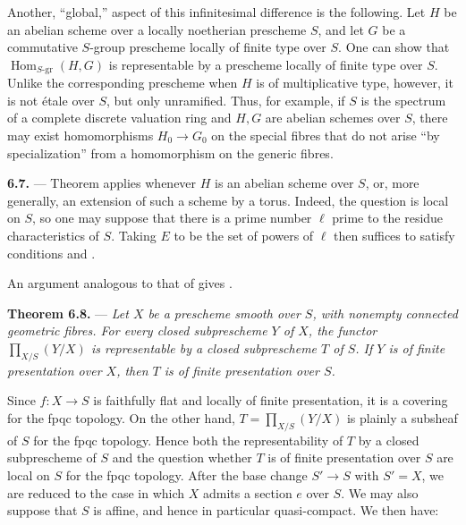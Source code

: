 Another, ``global,'' aspect of this infinitesimal difference is the
following.  Let \(H\) be an abelian scheme over a locally noetherian
prescheme \(S\), and let \(G\) be a commutative \(S\)-group prescheme
locally of finite type over \(S\).  One can show that
\(\operatorname{Hom}_{S\text{-}\mathrm{gr}}(H,G)\) is representable
by a prescheme locally of finite type over \(S\).  Unlike the
corresponding prescheme when \(H\) is of multiplicative type,
however, it is not étale over \(S\), but only unramified.  Thus, for
example, if \(S\) is the spectrum of a complete discrete valuation
ring and \(H,G\) are abelian schemes over \(S\), there may exist
homomorphisms \(H_0\to G_0\) on the special fibres that do not arise
``by specialization'' from a homomorphism on the generic fibres.

\medskip
\noindent{}\textbf{6.7.} ---
Theorem  applies whenever \(H\)
is an abelian scheme over \(S\), or, more generally, an extension of
such a scheme by a torus.  Indeed, the question is local on \(S\), so
one may suppose that there is a prime number \(\ell\) prime to the
residue characteristics of \(S\).  Taking \(E\) to be the set of
powers of \(\ell\) then suffices to satisfy conditions  and
.

An argument analogous to that of
 gives .

\medskip
\noindent{}\textbf{Theorem 6.8.} ---
\textit{Let \(X\) be a prescheme smooth over \(S\), with nonempty
connected geometric fibres.  For every closed subprescheme \(Y\) of
\(X\), the functor \(\prod_{X/S}(Y/X)\) is representable by a closed
subprescheme \(T\) of \(S\).  If \(Y\) is of finite presentation
over \(X\), then \(T\) is of finite presentation over \(S\).}

Since \(f:X\to S\) is faithfully flat and locally of finite
presentation, it is a covering for the fpqc topology.  On the other
hand, \(T=\prod_{X/S}(Y/X)\) is plainly a subsheaf of \(S\) for the
fpqc topology.  Hence both the representability of \(T\) by a closed
subprescheme of \(S\) and the question whether \(T\) is of finite
presentation over \(S\) are local on \(S\) for the fpqc topology.
After the base change \(S'\to S\) with \(S'=X\), we are reduced to
the case in which \(X\) admits a section \(e\) over \(S\).  We may
also suppose that \(S\) is affine, and hence in particular
quasi-compact.  We then have:


